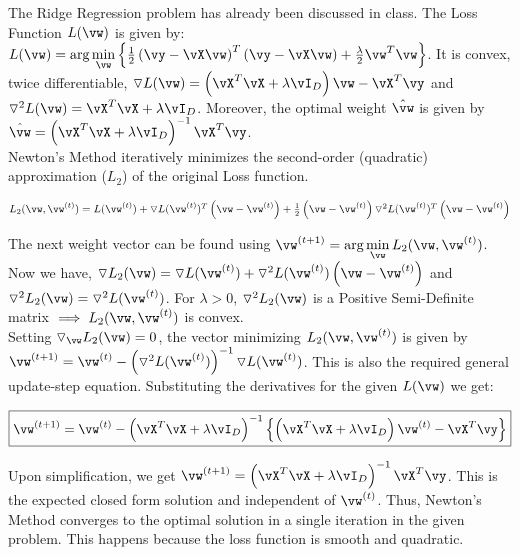 \documentclass[a4paper,12pt]{article}
\begin{document}
\begin{mlsolution}

The Ridge Regression problem has already been discussed in class. The Loss Function $L(\vw)$ is given by: $L(\vw) = \text{arg}\min\limits_{\vw}\bc{\frac{1}{2}\br{\vy-\vX\vw}^T\br{\vy-\vX\vw}+\frac{\lambda}{2}\vw^T\vw}$.
It is convex, twice differentiable, $\triangledown L(\vw) = \br{\vX^T\vX+\lambda\vI_D}\vw - \vX^T\vy$ and $\triangledown^2 L(\vw) = \vX^T\vX+\lambda\vI_D$. Moreover, the optimal weight $\hat{\vw}$ is given by $\hat{\vw} = \br{\vX^T\vX+\lambda\vI_D}^{-1}\vX^T\vy$.\\

Newton's Method iteratively minimizes the second-order (quadratic) approximation ($L_2$) of the original Loss function.

\begin{center}
    $L_2(\vw, \vw^{(t)}) = L(\vw^{(t)}) + \triangledown L(\vw^{(t)})^T\br{\vw-\vw^{(t)}} + \frac{1}{2}\br{\vw-\vw^{(t)}}\triangledown^2 L(\vw^{(t)})^T\br{\vw-\vw^{(t)}}$
\end{center}

The next weight vector can be found using $\vw^{(t+1)} = \text{arg} \min\limits_{\vw}L_2(\vw, \vw^{(t)})$. Now we have, $\triangledown L_2(\vw) = \triangledown L(\vw^{(t)}) + \triangledown^2 L(\vw^{(t)})\br{\vw-\vw^{(t)}}$ and $\triangledown^2 L_2(\vw) = \triangledown^2 L(\vw^{(t)})$. For $\lambda > 0$, $\triangledown^2 L_2(\vw)$ is a Positive Semi-Definite matrix $\implies L_2(\vw, \vw^{(t)})$ is convex.\\

Setting $\triangledown_\vw L_2(\vw) = 0$, the vector minimizing $L_2(\vw, \vw^{(t)})$ is given by $\vw^{(t+1)} = \vw^{(t)} - \br{\triangledown^2 L(\vw^{(t)})}^{-1}\triangledown L(\vw^{(t)})$. This is also the required general update-step equation. Substituting the derivatives for the given $L(\vw)$ we get:

\[
\boxed
{
    \vw^{(t+1)} = \vw^{(t)} - \br{\vX^T\vX+\lambda\vI_D}^{-1}\bc{\br{\vX^T\vX+\lambda\vI_D}\vw^{(t)} - \vX^T\vy}
}
\]

Upon simplification, we get $\vw^{(t+1)} = \br{\vX^T\vX+\lambda\vI_D}^{-1}\vX^T\vy$. This is the expected closed form solution and independent of $\vw^{(t)}$. Thus, Newton's Method converges to the optimal solution in a single iteration in the given problem. 
This happens because the loss function is smooth and quadratic.

\end{mlsolution}
	
\end{document}
